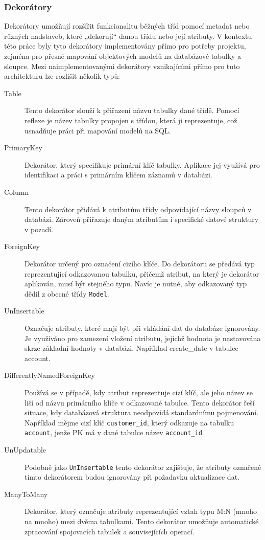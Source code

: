 \subsubsection{Dekorátory}
Dekorátory umožňují rozšířit funkcionalitu běžných tříd pomocí metadat nebo různých nadstaveb, které „dekorují“ danou třídu nebo její atributy\cite{TSDecorators}. V kontextu této práce byly tyto dekorátory implementovány přímo pro potřeby projektu, zejména pro přesné mapování objektových modelů na databázové tabulky a sloupce. Mezi naimplementovanými dekorátory vznikajícími přímo pro tuto architekturu lze rozlišit několik typů:
\begin{description}
    \item[Table] 
    Tento dekorátor slouží k přiřazení názvu tabulky dané třídě. Pomocí reflexe je název tabulky propojen s třídou, která ji reprezentuje, což usnadňuje práci při mapování modelů na SQL.
    \item[PrimaryKey]  
Dekorátor, který specifikuje primární klíč tabulky. Aplikace jej využívá pro identifikaci a práci s primárním klíčem záznamů v databázi.

\item[Column] 
Tento dekorátor přidává k atributům třídy odpovídající názvy sloupců v databázi. Zároveň přiřazuje daným atributům i specifické datové struktury v pozadí.

\item[ForeignKey] 
Dekorátor určený pro označení cizího klíče. Do dekorátoru se předává typ reprezentující odkazovanou tabulku, přičemž atribut, na který je dekorátor aplikován, musí být stejného typu. Navíc je nutné, aby odkazovaný typ dědil z obecné třídy \texttt{Model}.

\item[UnInsertable]
Označuje atributy, které mají být při vkládání dat do databáze ignorovány. Je využíváno pro zamezení vložení atributu, jejichž hodnota je nastavována skrze základní hodnoty v databázi. Například create\_date v tabulce account.

\item[DifferentlyNamedForeignKey]  
Používá se v případě, kdy atribut reprezentuje cizí klíč, ale jeho název se liší od názvu primárního klíče v odkazované tabulce. Tento dekorátor řeší situace, kdy databázová struktura neodpovídá standardnímu pojmenování. Například mějme cizí klíč \texttt{customer\_id}, který odkazuje na tabulku \texttt{account}, jenže PK má v dané tabulce název \texttt{account\_id}.

\item[UnUpdatable]  
Podobně jako \texttt{UnInsertable} tento dekorátor zajišťuje, že atributy označené tímto dekorátorem budou ignorovány při požadavku aktualizace dat.

\item[ManyToMany]
Dekorátor, který označuje atributy reprezentující vztah typu M:N (mnoho na mnoho) mezi dvěma tabulkami. Tento dekorátor umožňuje automatické zpracování spojovacích tabulek a souvisejících operací.
\end{description}